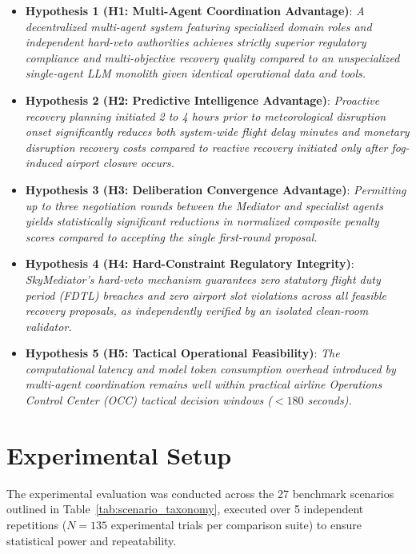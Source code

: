 \begin{itemize}
    \item \textbf{Hypothesis 1 (H1: Multi-Agent Coordination Advantage)}: 
    \textit{A decentralized multi-agent system featuring specialized domain roles and independent hard-veto authorities achieves strictly superior regulatory compliance and multi-objective recovery quality compared to an unspecialized single-agent LLM monolith given identical operational data and tools.}
    
    \item \textbf{Hypothesis 2 (H2: Predictive Intelligence Advantage)}: 
    \textit{Proactive recovery planning initiated 2 to 4 hours prior to meteorological disruption onset significantly reduces both system-wide flight delay minutes and monetary disruption recovery costs compared to reactive recovery initiated only after fog-induced airport closure occurs.}
    
    \item \textbf{Hypothesis 3 (H3: Deliberation Convergence Advantage)}: 
    \textit{Permitting up to three negotiation rounds between the Mediator and specialist agents yields statistically significant reductions in normalized composite penalty scores compared to accepting the single first-round proposal.}
    
    \item \textbf{Hypothesis 4 (H4: Hard-Constraint Regulatory Integrity)}: 
    \textit{SkyMediator's hard-veto mechanism guarantees zero statutory flight duty period (FDTL) breaches and zero airport slot violations across all feasible recovery proposals, as independently verified by an isolated clean-room validator.}
    
    \item \textbf{Hypothesis 5 (H5: Tactical Operational Feasibility)}: 
    \textit{The computational latency and model token consumption overhead introduced by multi-agent coordination remains well within practical airline Operations Control Center (OCC) tactical decision windows ($<180$ seconds).}
\end{itemize}

\section{Experimental Setup}
\label{sec:experimental_setup}

The experimental evaluation was conducted across the 27 benchmark scenarios outlined in Table~\ref{tab:scenario_taxonomy}, executed over 5 independent repetitions ($N=135$ experimental trials per comparison suite) to ensure statistical power and repeatability.


